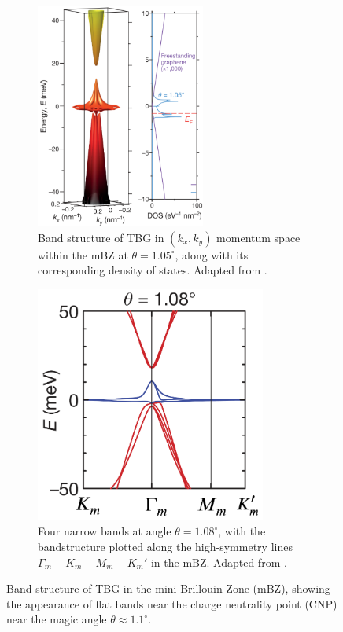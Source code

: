 \begin{figure}[H]
\centering
\begin{subfigure}{.48\textwidth}
  \centering
  \includegraphics[height=20em]{fig/tbg_bandstructure.png}
  \caption{Band structure of TBG in \((k_x, k_y)\) momentum space within the mBZ at \(\theta = 1.05^\circ\), along with its corresponding density of states. Adapted from \cite{cao2018}.}
  \label{fig:tbg_bandstructure_a}
\end{subfigure} \hfill
\begin{subfigure}{.48\textwidth}
  \centering
  \includegraphics[height=21em]{fig/tbg_4_narrowbands.png}
  \caption{Four narrow bands at angle \(\theta = 1.08^\circ\), with the bandstructure plotted along the high-symmetry lines \(\Gamma_m - K_m - M_m - K_m'\) in the mBZ. Adapted from \cite{cao2018_correlated}.}
  \label{fig:tbg_bandstructure_b}
\end{subfigure}
\caption{Band structure of TBG in the mini Brillouin Zone (mBZ), showing the appearance of flat bands near the charge neutrality point (CNP) near the magic angle $\theta \approx 1.1^\circ$.}
\label{fig:tbg_figures_taken_from_correlated_insul}
\end{figure}


